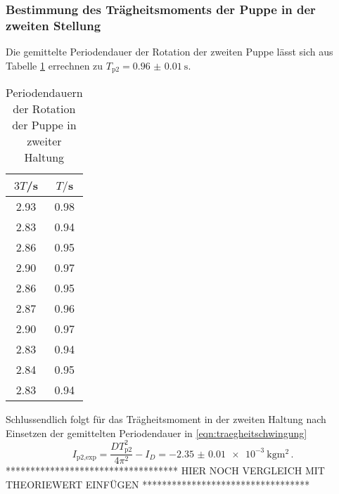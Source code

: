 \subsubsection{Bestimmung des Trägheitsmoments der Puppe in der zweiten Stellung}
Die gemittelte Periodendauer der Rotation der zweiten Puppe lässt sich aus Tabelle
\ref{tab:puppe2} errechnen zu $T_{\text{p2}}=\SI{0.96(001)}{\second}$.
\begin{table}[H]
\centering
\caption{Periodendauern der Rotation der Puppe in zweiter Haltung}
\label{tab:puppe2}
\begin{tabular}{c c}
\toprule
$3T$/s & $T/$s \\
\midrule
2.93 & 0.98 \\
2.83 & 0.94 \\
2.86 & 0.95 \\
2.90 & 0.97 \\
2.86 & 0.95 \\
2.87 & 0.96 \\
2.90 & 0.97 \\
2.83 & 0.94 \\
2.84 & 0.95 \\
2.83 & 0.94 \\
\bottomrule
\end{tabular}
\end{table}
Schlussendlich folgt für das Trägheitsmoment in der zweiten Haltung nach Einsetzen
der gemittelten Periodendauer in \eqref{eqn:traegheitschwingung}
\begin{equation}
  I_{\text{p2,exp}} = \frac{DT_{\text{p2}}^2}{4\pi^2}-I_D = \SI{-2.35(001)e-3}{\kilogram\meter\squared}\,.
\end{equation}
***********************************
HIER NOCH VERGLEICH MIT THEORIEWERT EINFÜGEN
**********************************
